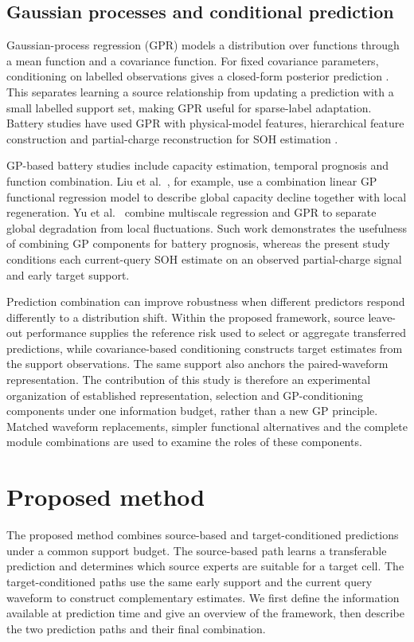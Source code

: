 \documentclass[preprint,12pt]{elsarticle}
\begin{document}
\subsection{Gaussian processes and conditional prediction}
Gaussian-process regression (GPR) models a distribution over functions through a mean function and a covariance function. For fixed covariance parameters, conditioning on labelled observations gives a closed-form posterior prediction \citep{rasmussen2006,mackay1998}. This separates learning a source relationship from updating a prediction with a small labelled support set, making GPR useful for sparse-label adaptation. Battery studies have used GPR with physical-model features, hierarchical feature construction and partial-charge reconstruction for SOH estimation \citep{lyu2020,jin2023,xiong2023}.

GP-based battery studies include capacity estimation, temporal prognosis and function combination. Liu et al.\ \citep{calce_gp2013}, for example, use a combination linear GP functional regression model to describe global capacity decline together with local regeneration. Yu et al.\ \citep{yu2018} combine multiscale regression and GPR to separate global degradation from local fluctuations. Such work demonstrates the usefulness of combining GP components for battery prognosis, whereas the present study conditions each current-query SOH estimate on an observed partial-charge signal and early target support.

Prediction combination can improve robustness when different predictors respond differently to a distribution shift. Within the proposed framework, source leave-out performance supplies the reference risk used to select or aggregate transferred predictions, while covariance-based conditioning constructs target estimates from the support observations. The same support also anchors the paired-waveform representation. The contribution of this study is therefore an experimental organization of established representation, selection and GP-conditioning components under one information budget, rather than a new GP principle. Matched waveform replacements, simpler functional alternatives and the complete module combinations are used to examine the roles of these components.

\section{Proposed method}
\label{sec:method}
The proposed method combines source-based and target-conditioned predictions under a common support budget. The source-based path learns a transferable prediction and determines which source experts are suitable for a target cell. The target-conditioned paths use the same early support and the current query waveform to construct complementary estimates. We first define the information available at prediction time and give an overview of the framework, then describe the two prediction paths and their final combination.
\end{document}

